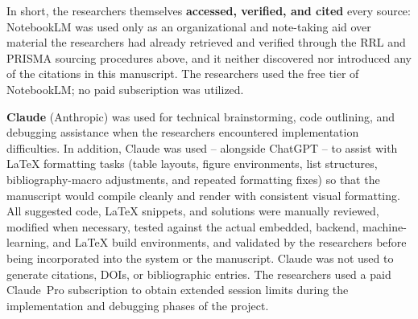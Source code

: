 In short, the researchers themselves \textbf{accessed, verified, and cited} every source: NotebookLM was used only as an organizational and note-taking aid over material the researchers had already retrieved and verified through the RRL and PRISMA sourcing procedures above, and it neither discovered nor introduced any of the citations in this manuscript. The researchers used the free tier of NotebookLM; no paid subscription was utilized.

\textbf{Claude} (Anthropic) was used for technical brainstorming, code outlining, and debugging assistance when the researchers encountered implementation difficulties. In addition, Claude was used -- alongside ChatGPT -- to assist with \LaTeX{} formatting tasks (table layouts, figure environments, list structures, bibliography-macro adjustments, and repeated formatting fixes) so that the manuscript would compile cleanly and render with consistent visual formatting. All suggested code, \LaTeX{} snippets, and solutions were manually reviewed, modified when necessary, tested against the actual embedded, backend, machine-learning, and \LaTeX{} build environments, and validated by the researchers before being incorporated into the system or the manuscript. Claude was not used to generate citations, DOIs, or bibliographic entries. The researchers used a paid Claude~Pro subscription to obtain extended session limits during the implementation and debugging phases of the project.
